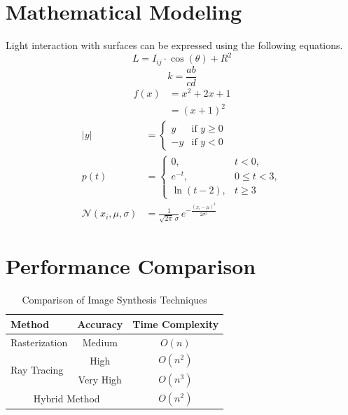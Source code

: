 \documentclass[11pt]{article}
\begin{document}
\section{Mathematical Modeling}
Light interaction with surfaces can be expressed using the following equations.
\begin{equation}
    L = I_{ij}\cdot \cos(\theta) + R^2
\end{equation}
\[
    k = \frac{ab}{cd}
\]
\begin{equation}
    \begin{split}
        f(x) &= x^2 + 2x + 1 \\
             &= (x+1)^2
    \end{split}
\end{equation}
\begin{align*}
    |y| &= \begin{cases} y  & \text{if } y \ge 0 \\ -y & \text{if } y < 0 \end{cases}\\[1ex]
    p(t) &= \begin{cases}
                0,            & t < 0, \\
                e^{-t},       & 0 \le t < 3, \\
                \ln(t-2),     & t \ge 3
            \end{cases}\\[1ex]
    \mathcal{N}(x_i,\mu,\sigma) &= \frac{1}{\sqrt{2\pi}\,\sigma}\,
        e^{-\frac{(x_i-\mu)^2}{2\sigma^2}}
\end{align*}

\section{Performance Comparison}
\begin{table}[ht]
    \centering
    \begin{tabular}{|l|c|c|}
        \hline
        Method & Accuracy & Time Complexity \\
        \hline
        Rasterization & Medium & $O(n)$ \\
        \hline
        \multirow{2}{*}{Ray Tracing} & High      & $O(n^2)$ \\
                                     & Very High & $O(n^3)$ \\
        \hline
        \multicolumn{2}{|c|}{Hybrid Method} & $O(n^2)$ \\
        \hline
    \end{tabular}
    \caption{Comparison of Image Synthesis Techniques}
    \label{tab:perf}
\end{table}
\end{document}
